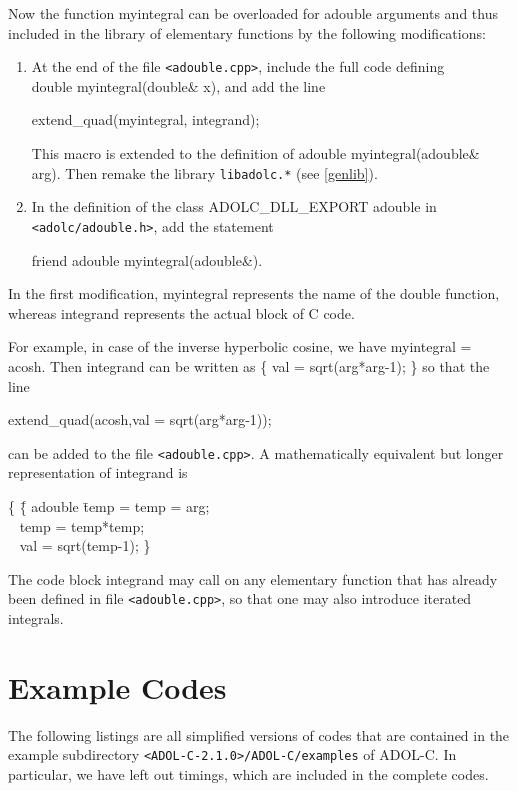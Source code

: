 \documentclass[11pt,twoside]{article}
\begin{document}
Now the function {\sf myintegral} can be overloaded for {\sf adouble}
arguments and thus included in the library of elementary functions 
by the following modifications:
\begin{enumerate}
\item
At the end of the file \verb=<adouble.cpp>=, include the full code
defining \\ {\sf double myintegral(double\& x)}, and add the line
\begin{center}
{\sf extend\_quad(myintegral, integrand); }
\end{center}
This macro is extended to the definition of 
 {\sf adouble myintegral(adouble\& arg)}.
Then remake the library \verb=libadolc.*= (see \autoref{genlib}). 
\item
In the definition of the class
{\sf ADOLC\_DLL\_EXPORT adouble} in \verb=<adolc/adouble.h>=, add the statement
\begin{center}
{\sf friend adouble myintegral(adouble\&)}.
\end{center}
\end{enumerate}
In the first modification, {\sf myintegral} represents the name of the
{\sf double} function, whereas {\sf integrand} represents the actual block
of C code. 

For example, in case of the inverse hyperbolic cosine, we have 
{\sf myintegral} = {\sf acosh}. Then {\sf integrand} can be written as 
{\sf \{ val = sqrt(arg*arg-1); \}} 
so that the line
\begin{center}
{\sf extend\_quad(acosh,val = sqrt(arg*arg-1));} 
\end{center}
can be added to the file \verb=<adouble.cpp>=.
A mathematically equivalent but longer representation of 
{\sf integrand} is
\begin{center}
\begin{tabbing}
{\sf \{ }\hspace{1.0in}\= {\sf  \{ adouble} \= temp =   \kill
  \> {\sf temp = arg;} \\
 \> \ \> {\sf  temp = temp*temp; } \\ 
 \> \ \> {\sf  val = sqrt(temp-1); \}}  
\end{tabbing}
\end{center} 
The code block {\sf integrand} may call on any elementary function that has already
been defined in file \verb=<adouble.cpp>=, so that one may also introduce
iterated integrals.
%
%
\section{Example Codes}
\label{example}
%
The following listings are all simplified versions of codes that
are contained in the example subdirectory 
\verb=<ADOL-C-2.1.0>/ADOL-C/examples= of ADOL-C. In particular,
we have left out timings, which are included in the complete codes.
%
\end{document}
